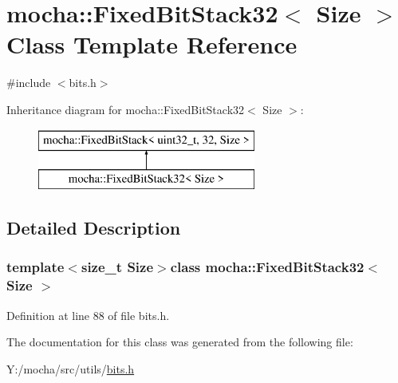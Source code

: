 \hypertarget{classmocha_1_1_fixed_bit_stack32}{
\section{mocha::FixedBitStack32$<$ Size $>$ Class Template Reference}
\label{classmocha_1_1_fixed_bit_stack32}
}


{\ttfamily \#include $<$bits.h$>$}

Inheritance diagram for mocha::FixedBitStack32$<$ Size $>$:\begin{figure}[H]
\begin{center}
\leavevmode
\includegraphics[height=2.000000cm]{classmocha_1_1_fixed_bit_stack32}
\end{center}
\end{figure}


\subsection{Detailed Description}
\subsubsection*{template$<$size\_\-t Size$>$class mocha::FixedBitStack32$<$ Size $>$}



Definition at line 88 of file bits.h.



The documentation for this class was generated from the following file:\begin{DoxyCompactItemize}
\item 
Y:/mocha/src/utils/\hyperlink{bits_8h}{bits.h}\end{DoxyCompactItemize}
